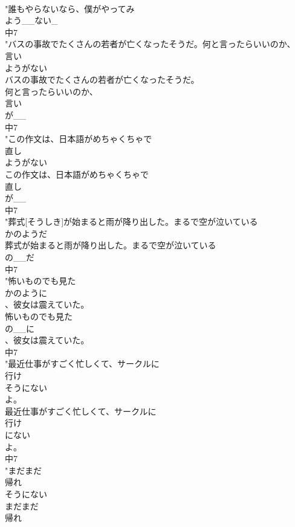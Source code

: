 \documentclass[8pt]{extreport}
\begin{document}
\begin{CJK}{UTF8}{min}
\\	"誰もやらないなら、僕がやってみ
\\	よう__ない_
\\	中7
\\	"バスの事故でたくさんの若者が亡くなったそうだ。何と言ったらいいのか、
\\	言い
\\	ようがない
\\	バスの事故でたくさんの若者が亡くなったそうだ。
\\	何と言ったらいいのか、
\\	言い
\\	が__
\\	中7
\\	"この作文は、日本語がめちゃくちゃで
\\	直し
\\	ようがない
\\	この作文は、日本語がめちゃくちゃで
\\	直し
\\	が__
\\	中7
\\	"葬式[そうしき]が始まると雨が降り出した。まるで空が泣いている
\\	かのようだ
\\	葬式が始まると雨が降り出した。まるで空が泣いている
\\	の__だ
\\	中7
\\	"怖いものでも見た
\\	かのように
\\	、彼女は震えていた。
\\	怖いものでも見た
\\	の__に
\\	、彼女は震えていた。
\\	中7
\\	"最近仕事がすごく忙しくて、サークルに
\\	行け
\\	そうにない
\\	よ。
\\	最近仕事がすごく忙しくて、サークルに
\\	行け
\\	にない
\\	よ。
\\	中7
\\	"まだまだ
\\	帰れ
\\	そうにない
\\	まだまだ
\\	帰れ

\end{CJK}
\end{document}
